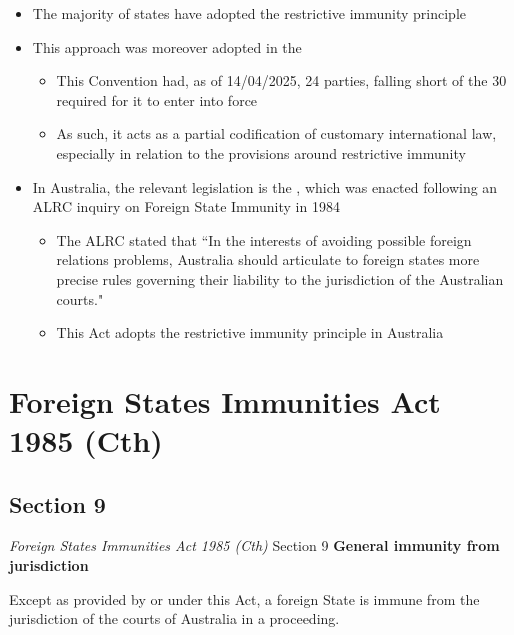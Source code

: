 \begin{itemize}
    \item The majority of states have adopted the restrictive immunity principle
    \item This approach was moreover adopted in the 
    \begin{itemize}
        \item This Convention had, as of 14/04/2025, 24 parties, falling short of the 30 required for it to enter into force
        \item As such, it acts as a partial codification of customary international law, especially in relation to the provisions around restrictive immunity
    \end{itemize}
    \item In Australia, the relevant legislation is the , which was enacted following an ALRC inquiry on Foreign State Immunity in 1984
    \begin{itemize}
        \item The ALRC stated that ``In the interests of avoiding possible foreign relations problems, Australia should articulate to foreign states more precise rules governing their liability to the jurisdiction of the Australian courts."
        \item This Act adopts the restrictive immunity principle in Australia
    \end{itemize}
\end{itemize}

\section{Foreign States Immunities Act 1985 (Cth)}

\subsection{Section 9}
\begin{statutedetails}{\textit{Foreign States Immunities Act 1985 (Cth)} Section 9}
    \flushleft
    \textbf{General immunity from jurisdiction}

    \vspace{\baselineskip}

    Except as provided by or under this Act, a foreign State is immune from the jurisdiction of the courts of Australia in a proceeding.
\end{statutedetails}

